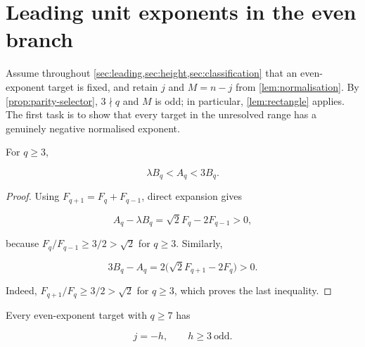 %
%
\section{Leading unit exponents in the even branch}
\label{sec:leading}

Assume throughout \cref{sec:leading,sec:height,sec:classification} that an
even-exponent target is fixed, and retain $j$ and $M=n-j$ from
\cref{lem:normalisation}. By \cref{prop:parity-selector}, $3\nmid q$ and
$M$ is odd; in particular, \cref{lem:rectangle} applies. The first task is
to show that every target in the unresolved range has a genuinely negative
normalised exponent.

\begin{lemma}
\label{lem:ratio-bounds}
For $q\geqslant3$,

\begin{equation}
 \lambda B_q<A_q<3B_q.
 \label{eq:AB-ratio}
\end{equation}
\end{lemma}

\begin{proof}
Using $F_{q+1}=F_q+F_{q-1}$, direct expansion gives

\begin{equation}
 A_q-\lambda B_q=\sqrt2F_q-2F_{q-1}>0,
\end{equation}

because $F_q/F_{q-1}\geqslant3/2>\sqrt2$ for $q\geqslant3$.
Similarly,

\begin{equation}
 3B_q-A_q=2\bigl(\sqrt2F_{q+1}-2F_q\bigr)>0.
\end{equation}

Indeed, $F_{q+1}/F_q\geqslant3/2>\sqrt2$ for $q\geqslant3$, which proves
the last inequality.
\end{proof}

\begin{proposition}
\label{prop:negative-exponent}
Every even-exponent target with $q\geqslant7$ has

\begin{equation}
 j=-h,
 \qquad
 h\geqslant3\ \text{odd}.
 \label{eq:j-negative}
\end{equation}
\end{proposition}

